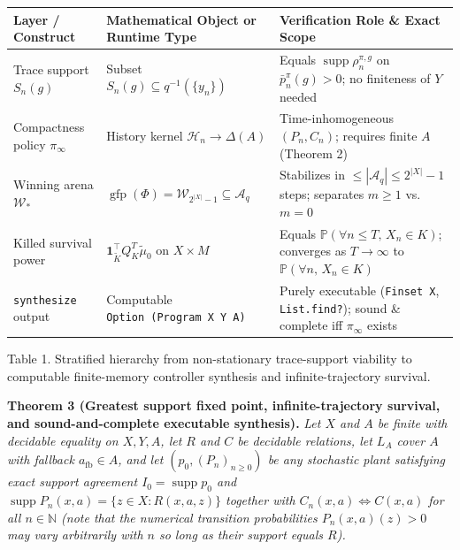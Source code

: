 \documentclass[11pt,a4paper]{article}
\newcounter{none}
\begin{document}
{\def\LTcaptype{none} %
\begin{longtable}[]{@{}
  >{\raggedright\arraybackslash}p{}
  >{\raggedright\arraybackslash}p{}
  >{\raggedright\arraybackslash}p{}@{}}
\toprule\noalign{}
\begin{minipage}[b]{\linewidth}\raggedright
Layer / Construct
\end{minipage} & \begin{minipage}[b]{\linewidth}\raggedright
Mathematical Object or Runtime Type
\end{minipage} & \begin{minipage}[b]{\linewidth}\raggedright
Verification Role \& Exact Scope
\end{minipage} \\
\midrule\noalign{}
\endhead
\bottomrule\noalign{}
\endlastfoot
Trace support \(S_n(g)\) & Subset \(S_n(g) \subseteq q^{-1}(\{y_n\})\) &
Equals \(\operatorname{supp}\rho_n^{\pi,g}\) on
\(\bar{p}_n^\pi(g) > 0\); no finiteness of \(Y\) needed \\
Compactness policy \(\pi_\infty\) & History kernel
\(\mathcal{H}_n \to \Delta(A)\) & Time-inhomogeneous \((P_n, C_n)\);
requires finite \(A\) (Theorem 2) \\
Winning arena \(\mathcal{W}_*\) &
\(\operatorname{gfp}(\Phi) = \mathcal{W}_{2^{|X|}-1} \subseteq \mathcal{A}_q\)
& Stabilizes in \(\le |\mathcal{A}_q| \le 2^{|X|}-1\) steps; separates
\(m \ge 1\) vs.~\(m=0\) \\
Killed survival power &
\(\mathbf{1}_{\widetilde{K}}^\top Q_K^T \widetilde{\mu}_0\) on
\(X \times M\) & Equals \(\mathbb{P}(\forall n \le T,\, X_n \in K)\);
converges as \(T \to \infty\) to
\(\mathbb{P}(\forall n,\, X_n \in K)\) \\
\texttt{synthesize} output & Computable
\texttt{Option\ (Program\ X\ Y\ A)} & Purely executable
(\texttt{Finset\ X}, \texttt{List.find?}); sound \& complete iff
\(\pi_\infty\) exists \\
\end{longtable}
}

Table 1. Stratified hierarchy from non-stationary trace-support
viability to computable finite-memory controller synthesis and
infinite-trajectory survival.

\textbf{Theorem 3 (Greatest support fixed point, infinite-trajectory
survival, and sound-and-complete executable synthesis).} \emph{Let \(X\)
and \(A\) be finite with decidable equality on \(X, Y, A\), let \(R\)
and \(C\) be decidable relations, let \(L_A\) cover \(A\) with fallback
\(a_{\mathrm{fb}} \in A\), and let \((p_0, (P_n)_{n\ge 0})\) be any
stochastic plant satisfying exact support agreement
\(I_0 = \operatorname{supp} p_0\) and
\(\operatorname{supp} P_n(x,a) = \{z \in X : R(x,a,z)\}\) together with
\(C_n(x,a) \iff C(x,a)\) for all \(n \in \mathbb{N}\) (note that the
numerical transition probabilities \(P_n(x,a)(z) > 0\) may vary
arbitrarily with \(n\) so long as their support equals \(R\)).}
\end{document}
